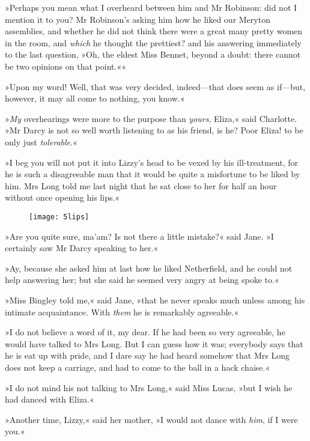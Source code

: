 »Perhaps you mean what I overheard between him and Mr Robinson: did not I mention it to you? Mr Robinson's asking him how he liked our Meryton assemblies, and whether he did not think there were a great many pretty women in the room, and \textit{which} he thought the prettiest? and his answering immediately to the last question, »Oh, the eldest Miss Bennet, beyond a doubt: there cannot be two opinions on that point.««

»Upon my word! Well, that was very decided, indeed—that does seem as if—but, however, it may all come to nothing, you know.«

»\textit{My} overhearings were more to the purpose than \textit{yours}, Eliza,« said Charlotte. »Mr Darcy is not so well worth listening to as his friend, is he? Poor Eliza! to be only just \textit{tolerable}.«

»I beg you will not put it into Lizzy's head to be vexed by his ill-treatment, for he is such a disagreeable man that it would be quite a misfortune to be liked by him. Mrs Long told me last night that he sat close to her for half an hour without once opening his lips.«

\begin{figure}[tbh!]
\centering
\texttt{[image: 5lips]}
\end{figure}

»Are you quite sure, ma'am? Is not there a little mistake?« said Jane. »I certainly saw Mr Darcy speaking to her.«

»Ay, because she asked him at last how he liked Netherfield, and he could not help answering her; but she said he seemed very angry at being spoke to.«

»Miss Bingley told me,« said Jane, »that he never speaks much unless among his intimate acquaintance. With \textit{them} he is remarkably agreeable.«

»I do not believe a word of it, my dear. If he had been so very agreeable, he would have talked to Mrs Long. But I can guess how it was; everybody says that he is eat up with pride, and I dare say he had heard somehow that Mrs Long does not keep a carriage, and had to come to the ball in a hack chaise.«

»I do not mind his not talking to Mrs Long,« said Miss Lucas, »but I wish he had danced with Eliza.«

»Another time, Lizzy,« said her mother, »I would not dance with \textit{him}, if I were you.«

